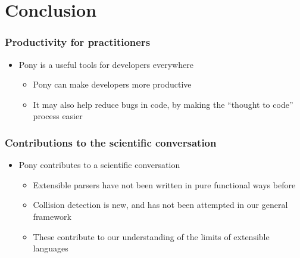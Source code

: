 \documentclass[bigger]{beamer}
\begin{document}
\section{Conclusion}
\label{sec-4}
\begin{frame}
\frametitle{Productivity for practitioners}
\label{sec-4-1}



\begin{itemize}
\item Pony is a useful tools for developers everywhere
\begin{itemize}
\item Pony can make developers more productive
\item It may also help reduce bugs in code, by making the ``thought to code'' process easier
\end{itemize}
\end{itemize}
\end{frame}
\begin{frame}
\frametitle{Contributions to the scientific conversation}
\label{sec-4-2}



\begin{itemize}
\item Pony contributes to a scientific conversation
\begin{itemize}
\item Extensible parsers have not been written in pure functional ways before
\item Collision detection is new, and has not been attempted in our general framework
\item These contribute to our understanding of the limits of extensible languages
\end{itemize}
\end{itemize}
\end{frame}
\end{document}
